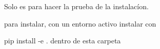 Solo es para hacer la prueba de la instalacíon.

para instalar, con un entorno activo instalar con

pip install -\/e . dentro de esta carpeta 
